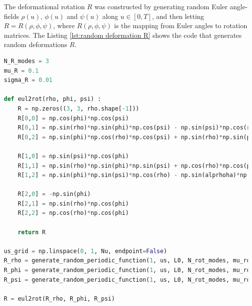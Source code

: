 \documentclass[]{cam-thesis}
\begin{document}
The deformational rotation $R$ was constructed by generating random Euler angle-fields $\rho(u)$, $\phi(u)$ and $\psi(u)$ along $u \in [0, T]$, and then letting $R = R(\rho, \phi, \psi)$, where $R(\rho, \phi, \psi)$ is the mapping from Euler angles to rotation matrices. The Listing \ref{lst:random deformation R} shows the code that generates random deformations $R$.

\begin{lstlisting}[language=Python, caption=Generating random deformational rotation field., label={lst:random deformation R}]
N_R_modes = 3
mu_R = 0.1
sigma_R = 0.01

def eul2rot(rho, phi, psi) :
    R = np.zeros((3, 3, rho.shape[-1]))
    R[0,0] = np.cos(phi)*np.cos(psi)
    R[0,1] = np.sin(rho)*np.sin(phi)*np.cos(psi) - np.sin(psi)*np.cos(rho)
    R[0,2] = np.sin(phi)*np.cos(rho)*np.cos(psi) + np.sin(rho)*np.sin(psi)
    
    R[1,0] = np.sin(psi)*np.cos(phi)
    R[1,1] = np.sin(rho)*np.sin(phi)*np.sin(psi) + np.cos(rho)*np.cos(psi)
    R[1,2] = np.sin(phi)*np.sin(psi)*np.cos(rho) - np.sin(alprhoha)*np.cos(psi)
    
    R[2,0] = -np.sin(phi)
    R[2,1] = np.sin(rho)*np.cos(phi)
    R[2,2] = np.cos(rho)*np.cos(phi)

    return R

us_grid = np.linspace(0, 1, Nu, endpoint=False)
R_rho = generate_random_periodic_function(1, us, L0, N_rot_modes, mu_rot, sigma_rot)[0]
R_phi = generate_random_periodic_function(1, us, L0, N_rot_modes, mu_rot, sigma_rot)[0]
R_psi = generate_random_periodic_function(1, us, L0, N_rot_modes, mu_rot, sigma_rot)[0]

R = eul2rot(R_rho, R_phi, R_psi)
\end{lstlisting}
\end{document}
